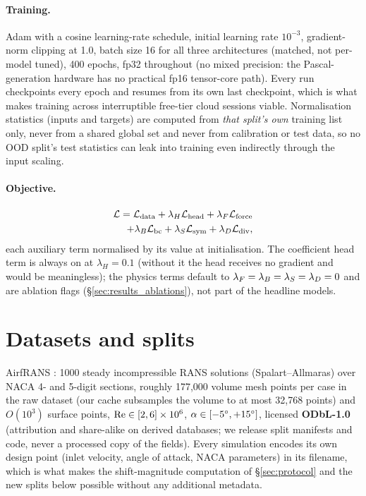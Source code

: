 \paragraph{Training.} Adam with a cosine learning-rate schedule, initial
learning rate $10^{-3}$, gradient-norm clipping at 1.0, batch size 16
for all three architectures (matched, not per-model tuned), 400 epochs, fp32
throughout (no mixed precision: the Pascal-generation hardware has no
practical fp16 tensor-core path). Every run checkpoints every epoch and resumes
from its own last checkpoint, which is what makes training across
interruptible free-tier cloud sessions viable. Normalisation statistics
(inputs and targets) are computed from \emph{that split's own} training list
only, never from a shared global set and never from calibration or test data,
so no OOD split's test statistics can leak into training even indirectly
through the input scaling.

\paragraph{Objective.}
\begin{equation}
\begin{split}
  \mathcal{L} = \mathcal{L}_{\text{data}} + \lambda_H \mathcal{L}_{\text{head}} + \lambda_F \mathcal{L}_{\text{force}} \\
        + \lambda_B \mathcal{L}_{\text{bc}} + \lambda_S \mathcal{L}_{\text{sym}} + \lambda_D \mathcal{L}_{\text{div}},
\end{split}
\end{equation}
each auxiliary term normalised by its value at initialisation. The coefficient
head term is always on at $\lambda_H = 0.1$ (without it the head receives no
gradient and \FSC{} would be meaningless); the physics terms default to
$\lambda_F = \lambda_B = \lambda_S = \lambda_D = 0$ and are ablation flags
(\S\ref{sec:results_ablations}), not part of the headline models.

\section{Datasets and splits}
\label{sec:data}

AirfRANS \citep{bonnet2022airfrans}: 1000 steady incompressible RANS solutions
(Spalart--Allmaras) over NACA 4- and 5-digit sections, roughly 177{,}000 volume
mesh points per case in the raw dataset (our cache subsamples the volume to at
most 32{,}768 points) and $O(10^3)$ surface points, $\mathrm{Re} \in [2,6]\times 10^6$,
$\alpha \in [-5^{\circ}, +15^{\circ}]$, licensed \textbf{ODbL-1.0} (attribution and
share-alike on derived databases; we release split manifests and code, never a
processed copy of the fields). Every simulation encodes its own design point
(inlet velocity, angle of attack, NACA parameters) in its filename, which is
what makes the shift-magnitude computation of \S\ref{sec:protocol} and the new
splits below possible without any additional metadata.

